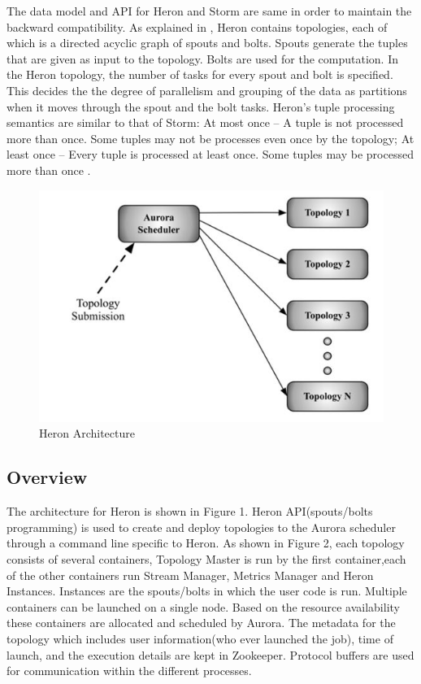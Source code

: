 \documentclass[9pt,twocolumn,twoside]{../../styles/osajnl}
\begin{document}
The data model and API for Heron and Storm are same in order to maintain the backward compatibility. As explained in \cite{TwitterHeron2}, Heron contains topologies, each of which is a directed acyclic graph of spouts and bolts. Spouts generate the tuples that are given as input to the topology. Bolts are used for the computation. In the Heron topology, the number of tasks for every spout and bolt is specified. This decides the the degree of parallelism and grouping of the data as partitions when it moves through the spout and the bolt tasks. Heron’s tuple processing semantics are similar to that of Storm: At most once – A tuple is not processed more than once. Some tuples may not be processes even once by the topology; At least once – Every tuple is processed at least once. Some tuples may be processed more than once \cite{TwitterHeron2}.
\begin{figure}[htbp]
\begin{center}
\centering
\includegraphics[width=\linewidth]{images/img1}
\caption{Heron Architecture \cite{TwitterHeron2}}
\label{fig:false-color}
\end{center}
\end{figure}
\subsection{Overview}
The architecture for Heron is shown in Figure 1. Heron API(spouts/bolts programming) is used to create and
deploy topologies to the Aurora scheduler through a command line specific to Heron. As shown in Figure 2, each topology consists of several containers, Topology Master is run by the first container,each of the other containers run Stream Manager, Metrics Manager and Heron Instances. Instances are the spouts/bolts in which the user code is run. Multiple containers can be launched on a single node. Based on the resource availability these containers are allocated and scheduled by Aurora. The metadata for the topology which includes user information(who ever launched the job), time of launch, and the execution details are kept in Zookeeper. Protocol buffers  are used for communication within the different processes.
\end{document}
